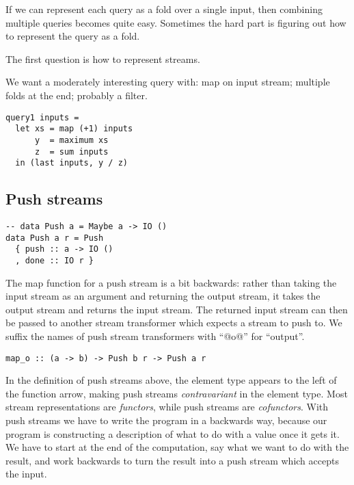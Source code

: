 




If we can represent each query as a fold over a single input, then combining multiple queries becomes quite easy.
Sometimes the hard part is figuring out how to represent the query as a fold.

The first question is how to represent streams.

We want a moderately interesting query with: map on input stream; multiple folds at the end; probably a filter.

\begin{lstlisting}
query1 inputs =
  let xs = map (+1) inputs
      y  = maximum xs
      z  = sum inputs
  in (last inputs, y / z)
\end{lstlisting}

\subsection{Push streams}


\begin{lstlisting}
-- data Push a = Maybe a -> IO ()
data Push a r = Push
  { push :: a -> IO ()
  , done :: IO r }
\end{lstlisting}

The map function for a push stream is a bit backwards: rather than taking the input stream as an argument and returning the output stream, it takes the output stream and returns the input stream.
The returned input stream can then be passed to another stream transformer which expects a stream to push to.
We suffix the names of push stream transformers with ``@o@'' for ``output''.

\begin{lstlisting}
map_o :: (a -> b) -> Push b r -> Push a r
\end{lstlisting}

In the definition of push streams above, the element type appears to the left of the function arrow, making push streams \emph{contravariant} in the element type.
Most stream representations are \emph{functors}, while push streams are \emph{cofunctors}.
With push streams we have to write the program in a backwards way, because our program is constructing a description of what to do with a value once it gets it.
We have to start at the end of the computation, say what we want to do with the result, and work backwards to turn the result into a push stream which accepts the input.

